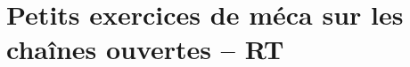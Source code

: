 \documentclass[10pt,fleqn]{article}
\newcommand{\repRel}{../..}
\newcommand{\repStyle}{\repRel/Style}
\begin{document}
\def\xxcompetences{}
\def\xxfigures{}
\graphicspath{{\repStyle/png/}}
\setlength{\columnseprule}{.1pt}

\def\xxpartie{}
\def\xxnumpartie{}
\def\xxchapitre{}
\def\xxnumchapitre{}
\def\xxactivite{DDV}
\def\xxtitreexo{Les ptits devoirs de vacances}
\def\xxsourceexo{Xavier Pessoles}

\pagestyle{fancy}
\thispagestyle{plain}
\vspace{4.5cm}
\proffalse


\section{Petits exercices de méca sur les chaînes ouvertes -- RT} 
\end{document}

